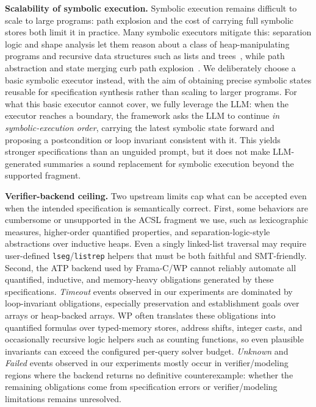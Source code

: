 \smallskip
\noindent\textbf{Scalability of symbolic execution.}
Symbolic execution remains difficult to scale to large programs: path explosion
and the cost of carrying full symbolic stores both limit it in practice. Many symbolic executors mitigate this: separation
logic and shape analysis let them reason about a class of heap-manipulating
programs and recursive data structures such as lists and
trees~\cite{calcagno2009compositional}, while path abstraction
and state merging curb path explosion~\cite{kuznetsov2012merging,avgerinos2014veritesting}.
We deliberately choose a basic symbolic executor instead, with the aim of
obtaining precise symbolic states reusable for specification synthesis rather
than scaling to larger programs. For what this basic executor cannot cover, we
fully leverage the LLM: when the executor reaches a boundary, the framework asks
the LLM to continue \emph{in symbolic-execution order}, carrying the latest
symbolic state forward and proposing a postcondition or loop invariant
consistent with it. This yields stronger specifications than an unguided prompt,
but it does not make LLM-generated summaries a sound replacement for symbolic
execution beyond the supported fragment.


\smallskip
\noindent\textbf{Verifier-backend ceiling.}
Two upstream limits cap what can be accepted even when the intended
specification is semantically correct. First, some behaviors are cumbersome or
unsupported in the ACSL fragment we use, such as lexicographic measures,
higher-order quantified properties, and separation-logic-style abstractions
over inductive heaps. Even a singly linked-list traversal may require
user-defined \texttt{lseg}/\texttt{listrep} helpers that must be both faithful
and SMT-friendly. Second, the ATP backend used by Frama-C/WP cannot reliably
automate all quantified, inductive, and memory-heavy obligations generated by
these specifications. 
\emph{Timeout} events observed in our experiments are dominated by loop-invariant obligations, especially
preservation and establishment goals over arrays or heap-backed arrays. 
WP often translates these obligations into
quantified formulas over typed-memory stores, address shifts, integer casts, and
occasionally recursive logic helpers such as counting functions, so even
plausible invariants can exceed the configured per-query solver budget.
\emph{Unknown} and \emph{Failed} events observed in our experiments mostly occur
in verifier/modeling regions where the backend returns no definitive
counterexample: whether the remaining obligations come from specification
errors or verifier/modeling limitations remains unresolved.

